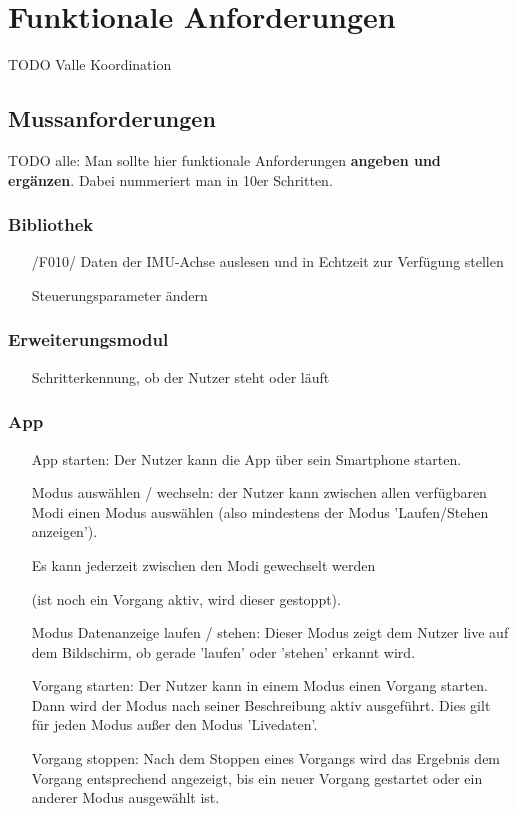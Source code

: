 \documentclass[a4paper,12pt]{article}
\begin{document}
\section{Funktionale Anforderungen}
TODO Valle Koordination

  \subsection{Mussanforderungen}
  TODO alle: Man sollte hier funktionale Anforderungen \textbf{angeben und ergänzen}. Dabei nummeriert man in 10er Schritten.
    \subsubsection{Bibliothek}
    \begin{itemize}
      \item[/F010/] Daten der IMU-Achse auslesen und in Echtzeit zur Verfügung stellen
      \item[] Steuerungsparameter ändern %
    \end{itemize}
    \subsubsection{Erweiterungsmodul}
    \begin{itemize}
      \item[] Schritterkennung, ob der Nutzer steht oder läuft
    \end{itemize}
    \subsubsection{App}
    \begin{itemize}
      \item[] \textsf{App starten:} Der Nutzer kann die App über sein Smartphone starten. %
      \item[] \textsf{Modus auswählen / wechseln:} der Nutzer kann zwischen allen verfügbaren Modi einen Modus auswählen (also mindestens der Modus 'Laufen/Stehen anzeigen'). 
      \item[] Es kann jederzeit zwischen den Modi gewechselt werden 
      \item[] (ist noch ein Vorgang aktiv, wird dieser gestoppt).
      \item[] \textsf{Modus Datenanzeige laufen / stehen:} Dieser Modus zeigt dem Nutzer live auf dem Bildschirm, ob gerade 'laufen' oder 'stehen' erkannt wird.
      \item[] \textsf{Vorgang starten:} Der Nutzer kann in einem Modus einen Vorgang starten. Dann wird der Modus nach seiner Beschreibung aktiv ausgeführt. Dies gilt für jeden Modus außer den Modus 'Livedaten'.
      \item[] \textsf{Vorgang stoppen:} Nach dem Stoppen eines Vorgangs wird das Ergebnis dem Vorgang entsprechend angezeigt, bis ein neuer Vorgang gestartet oder ein anderer Modus ausgewählt ist.  
    \end{itemize}
\end{document}
